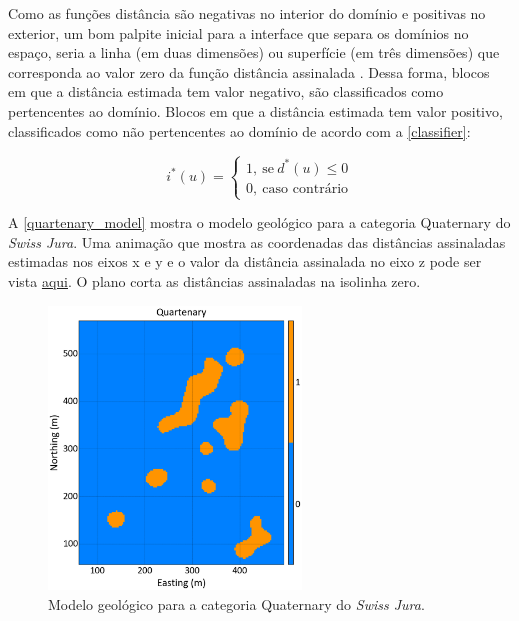 Como as funções distância são negativas no interior do domínio e positivas no exterior, um bom palpite inicial para a interface que separa os domínios no espaço, seria a linha (em duas dimensões) ou superfície (em três dimensões) que corresponda ao valor zero da função distância assinalada \cite{wildedeutschcalibrate}. Dessa forma, blocos em que a distância estimada tem valor negativo, são classificados como pertencentes ao domínio. Blocos em que a distância estimada tem valor positivo, classificados como não pertencentes ao domínio de acordo com a \autoref{classifier}:

\begin{equation}
	i^*(u)=\begin{cases}
	1,\:\textrm{se}\:d^*(u)\leq0\\
	0,\:\textrm{caso contrário}\end{cases}
    \label{classifier}
\end{equation}

A \autoref{quartenary_model} mostra o modelo geológico para a categoria Quaternary do \textit{Swiss Jura}. Uma animação que mostra as coordenadas das distâncias assinaladas estimadas nos eixos x e y e o valor da distância assinalada no eixo z pode ser vista \href{https://github.com/robertorolo/assessing_geological_model_uncertainty_with_probability_fields/blob/main/anim_onecat.gif}{aqui}. O plano corta as distâncias assinaladas na isolinha zero. 

\begin{figure}[H]
	\centering
	\caption{\label{quartenary_model}Modelo geológico para a categoria Quaternary do \textit{Swiss Jura}.}
	\includegraphics[width=0.6\textwidth]{capitulo_2/imagens/geomodel_quaternary.png}
\end{figure}

